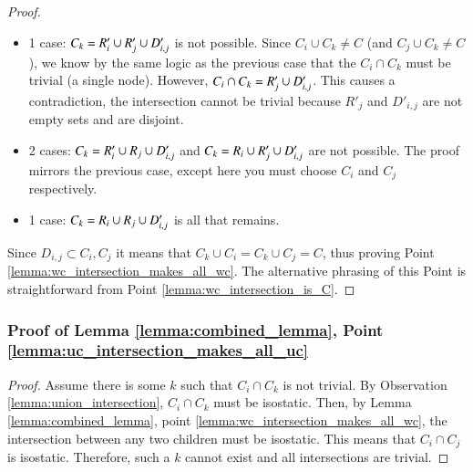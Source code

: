 \begin{proof}
\begin{itemize}
        \item 1 case: \usestwod $C_k=R'_i\cup R'_j\cup D'_{i,j}$ is not possible. Since $C_i\cup C_k\neq C$ (and $C_j\cup C_k\neq C$), we know by the same logic as the previous case that the $C_i\cap C_k$ must be trivial (a single node). However, $C_i\cap C_k=R'_j\cup D'_{i,j}$. This causes a contradiction, the intersection cannot be trivial because $R'_j$ and $D'_{i,j}$ are not empty sets and are disjoint.

        \item 2 cases: \usestwod $C_k=R'_i\cup R_j\cup D'_{i,j}$ and $C_k=R_i\cup R'_j\cup D'_{i,j}$ are not possible. The proof mirrors the previous case, except here you must choose $C_i$ and $C_j$ respectively.

        \item 1 case: $C_k=R_i\cup R_j\cup D'_{i,j}$ is all that remains.
    \end{itemize}

    Since $D_{i,j}\subset C_i, C_j$ it means that $C_k\cup C_i = C_k \cup C_j = C$, thus proving Point \ref{lemma:wc_intersection_makes_all_wc}.
    The alternative phrasing of this Point is straightforward from Point \ref{lemma:wc_intersection_is_C}.
\end{proof}

\subsubsection{Proof of Lemma \ref{lemma:combined_lemma}, Point \ref{lemma:uc_intersection_makes_all_uc}}

\begin{proof}
    Assume there is some $k$ such that $C_i\cap C_k$ is not trivial. By Observation \ref{lemma:union_intersection}, $C_i\cap C_k$ must be isostatic. Then, by Lemma \ref{lemma:combined_lemma}, point \ref{lemma:wc_intersection_makes_all_wc}, the intersection between any two children must be isostatic. This means that $C_i\cap C_j$ is isostatic. Therefore, such a $k$ cannot exist and all intersections are trivial.
\end{proof}







